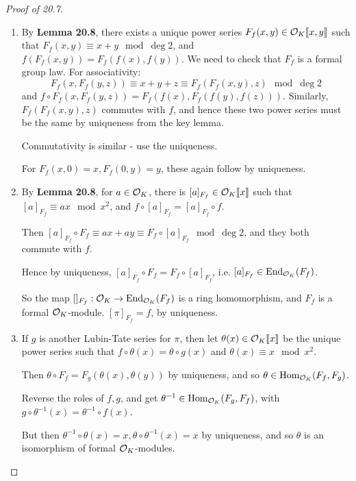 \documentclass[10pt,a4paper]{article}
\begin{document}
\begin{proof}[Proof of 20.7]
  \begin{enumerate}
    \item By \textbf{Lemma 20.8}, there exists a unique power series $F_f(x,y) \in \mathcal{O}_K\llbracket x,y\rrbracket$ such that $F_f(x,y) \equiv x+y \mod \deg 2$, and $f(F_f(x,y)) = F_f(f(x),f(y))$. We need to check that $F_f$ is a formal group law. For associativity:
    \[F_f(x, F_f(y,z)) \equiv x+y+z \equiv F_f(F_f(x,y), z) \mod \deg 2\]
    and $f\circ F_f(x, F_f(y,z)) = F_f(f(x), F_f(f(y), f(z)))$. Similarly, $F_f(F_f(x,y),z)$ commutes with $f$, and hence these two power series must be the same by uniqueness from the key lemma.

    Commutativity is similar - use the uniqueness.

    For $F_f(x,0) = x, F_f(0,y) = y$, these again follow by uniqueness.

    \item By \textbf{Lemma 20.8}, for $a \in \mathcal{O}_K$, there is $[a]_{F_f} \in \mathcal{O}_K \llbracket x\rrbracket$ such that $[a]_{F_f} \equiv ax \mod x^2$, and $f\circ [a]_{F_f} = [a]_{F_f}\circ f$.

     Then $[a]_{F_f} \circ F_f \equiv ax+ay \equiv F_f \circ [a]_{F_f} \mod \deg 2$, and they both commute with $f$.

     Hence by uniqueness, $[a]_{F_f}\circ F_f = F_f \circ [a]_{F_f}$, i.e. $[a]_{F_f} \in \operatorname{End}_{\mathcal{O}_K}(F_f)$.

     So the map $[]_{F_f}:\mathcal{O}_K \to \operatorname{End}_{\mathcal{O}_K}(F_f)$ is a ring homomorphism, and $F_f$ is a formal $\mathcal{O}_K$-module. $[\pi]_{F_f} = f$, by uniqueness.

     \item If $g$ is another Lubin-Tate series for $\pi$, then let $\theta(x) \in \mathcal{O}_K\llbracket x\rrbracket$ be the unique power series such that $f \circ \theta(x) = \theta \circ g(x)$ and $\theta(x)\equiv x \mod x^2$.

     Then $\theta \circ F_f = F_g(\theta(x),\theta(y))$ by uniqueness, and so $\theta \in \operatorname{Hom}_{\mathcal{O}_K}(F_f, F_g)$.

     Reverse the roles of $f, g$, and get $\theta^{-1} \in \operatorname{Hom}_{\mathcal{O}_K}(F_g, F_f)$, with $g \circ \theta^{-1}(x) = \theta^{-1}\circ f(x)$.

     But then $\theta^{-1}\circ \theta(x) = x, \theta \circ \theta^{-1}(x) = x$ by uniqueness, and so $\theta$ is an isomorphism of formal $\mathcal{O}_K$-modules.
  \end{enumerate}
\end{proof}
\end{document}
